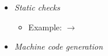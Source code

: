 {\begin{itemize}
\begin{itemize}
\begin{itemize}
\item Example:  $\rightarrow$ 

\end{itemize}

\item \textit{Static checks}

\begin{itemize}

\item Example:  $\rightarrow$ 

\end{itemize}

\item \textit{Machine code generation}

\end{itemize}

\end{itemize}

}